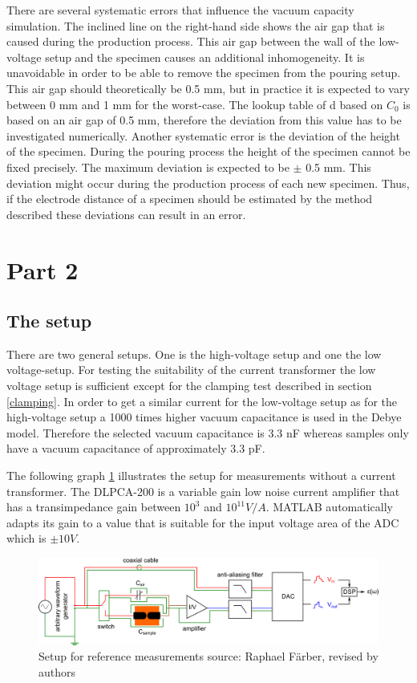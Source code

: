  There are several systematic errors that influence the vacuum capacity simulation. The inclined line on the right-hand side shows the air gap that is caused during the production process. This air gap between the wall of the low-voltage setup and the specimen causes an additional inhomogeneity. It is unavoidable in order to be able to remove the specimen from the pouring setup. This air gap should theoretically be 0.5 mm, but in practice it is expected to vary between 0 mm and 1 mm for the worst-case. The lookup table of d based on $C_0$ is based on an air gap of 0.5 mm, therefore the deviation from this value has to be investigated numerically.
Another systematic error is the deviation of the height of the specimen. During  the pouring process the height of the specimen cannot be fixed precisely. The maximum deviation is expected to be $\pm$ 0.5 mm. This deviation might occur during the production process of each new specimen. Thus, if the electrode distance of a specimen should be estimated by the method described these deviations can result in an error. 
 
\section{Part 2}
\subsection{The setup}
There are two general setups. One is the high-voltage setup and one the low voltage-setup. For testing the suitability of the current transformer the low voltage setup is sufficient except for the clamping test described in section \ref{clamping}. In order to get a similar current for the low-voltage setup as for the high-voltage setup a 1000 times higher vacuum capacitance is used in the Debye model. Therefore the selected vacuum capacitance is 3.3 nF whereas samples only have a vacuum capacitance of approximately 3.3 pF.  

The following graph \ref{sec.setup_amplifier} illustrates the setup for measurements without a current transformer. The DLPCA-200 is a variable gain low noise current amplifier that has a transimpedance gain between $10^3$ and $10^{11} V/A$. MATLAB automatically adapts its gain to a value that is suitable for the input voltage area of the ADC which is $\pm 10V$. 

\begin{figure}[htbp]
	\centering
	\includegraphics[width=\textwidth]{figures/Method/setup/setup_amplifier}		
	\caption[Kurze Abbildungsbeschreibung]{Setup for reference measurements {source: Raphael F\"arber, revised by authors}} 
	\label{sec.setup_amplifier}

\end{figure}

